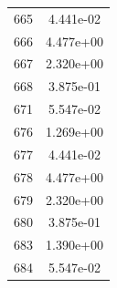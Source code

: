 \documentclass[12pt]{article}
\begin{document}
\begin{longtable}{@{}cc@{}}
665 & 4.441e-02 \\
666 & 4.477e+00 \\
667 & 2.320e+00 \\
668 & 3.875e-01 \\
671 & 5.547e-02 \\
676 & 1.269e+00 \\
677 & 4.441e-02 \\
678 & 4.477e+00 \\
679 & 2.320e+00 \\
680 & 3.875e-01 \\
683 & 1.390e+00 \\
684 & 5.547e-02 \\

\bottomrule
\end{longtable}
\end{document}

